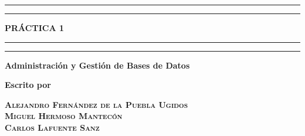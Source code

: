 \documentclass[a4paper, 11pt, oneside]{article} %
\begin{document}
 

\begin{titlepage} %

	\centering
	
	\scshape %
	
	\vspace*{\baselineskip} %
	
	
	\rule{\textwidth}{1.6pt}\vspace*{-\baselineskip}\vspace*{2pt} %
	\rule{\textwidth}{0.4pt} %
	
	\vspace{0.75\baselineskip} %
	
	{\LARGE \textbf{PRÁCTICA 1}} %
	
	\vspace{0.75\baselineskip} %
	
	\rule{\textwidth}{0.4pt}\vspace*{-\baselineskip}\vspace{3.2pt} %
	\rule{\textwidth}{1.6pt} %
	
	\vspace{2\baselineskip} %
	
	
	\textbf{Administración y Gestión de Bases de Datos} %
	
	\vspace*{3\baselineskip} %
	
	
	\textbf{Escrito por}
	
	\vspace{0.5\baselineskip} %
	
	{\scshape\Large \textbf{Alejandro Fernández de la Puebla Ugidos\\ Miguel Hermoso Mantecón \\ Carlos Lafuente Sanz \\}} %
	

\end{titlepage}
\end{document}
